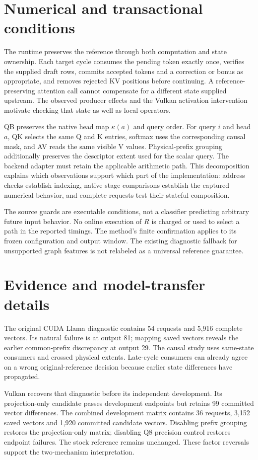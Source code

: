\section{Numerical and transactional conditions}
\label{app:conditions}
The runtime preserves the reference through both computation and state ownership. Each target cycle consumes the pending token exactly once, verifies the supplied draft rows, commits accepted tokens and a correction or bonus as appropriate, and removes rejected KV positions before continuing. A reference-preserving attention call cannot compensate for a different state supplied upstream. The observed producer effects and the Vulkan activation intervention motivate checking that state as well as local operators.

QB preserves the native head map $\kappa(a)$ and query order. For query $i$ and head $a$, QK selects the same Q and K entries, softmax uses the corresponding causal mask, and AV reads the same visible V values. Physical-prefix grouping additionally preserves the descriptor extent used for the scalar query. The backend adapter must retain the applicable arithmetic path. This decomposition explains which observations support which part of the implementation: address checks establish indexing, native stage comparisons establish the captured numerical behavior, and complete requests test their stateful composition.

The source guards are executable conditions, not a classifier predicting arbitrary future input behavior. No online execution of $R$ is charged or used to select a path in the reported timings. The method's finite confirmation applies to its frozen configuration and output window. The existing diagnostic fallback for unsupported graph features is not relabeled as a universal reference guarantee.

\section{Evidence and model-transfer details}
\label{app:transfer}
The original CUDA Llama diagnostic contains 54 requests and 5,916 complete vectors. Its natural failure is at output 81; mapping saved vectors reveals the earlier common-prefix discrepancy at output 29. The causal study uses same-state consumers and crossed physical extents. Late-cycle consumers can already agree on a wrong original-reference decision because earlier state differences have propagated.

Vulkan recovers that diagnostic before its independent development. Its projection-only candidate passes development endpoints but retains 99 committed vector differences. The combined development matrix contains 36 requests, 3,152 saved vectors and 1,920 committed candidate vectors. Disabling prefix grouping restores the projection-only matrix; disabling Q8 precision control restores endpoint failures. The stock reference remains unchanged. These factor reversals support the two-mechanism interpretation.

